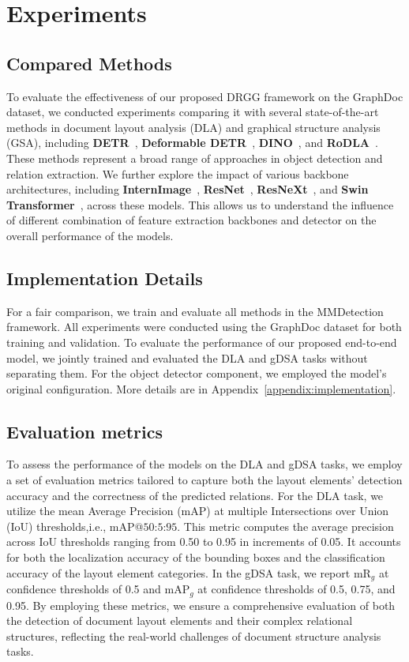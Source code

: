 \section{Experiments}

\subsection{Compared Methods}
To evaluate the effectiveness of our proposed DRGG framework on the GraphDoc dataset, we conducted experiments comparing it with several state-of-the-art methods in document layout analysis (DLA) and graphical structure analysis (GSA), including \textbf{DETR}~\citep{DETR}, \textbf{Deformable DETR}~\citep{zhu2020deformable}, \textbf{DINO}~\citep{zhang2022dino}, and \textbf{RoDLA}~\citep{chen2024rodla}. These methods represent a broad range of approaches in object detection and relation extraction. We further explore the impact of various backbone architectures, including \textbf{InternImage}~\citep{wang2022internimage}, \textbf{ResNet}~\citep{he2016deepresnet}, \textbf{ResNeXt}~\citep{ResNext}, and \textbf{Swin Transformer}~\citep{liu2021swintransformerhierarchicalvision}, across these models. This allows us to understand the influence of different combination of feature extraction backbones and detector on the overall performance of the models.

\subsection{Implementation Details}
\label{implementation}
For a fair comparison, we train and evaluate all methods in the MMDetection~\citep{mmdetection} framework. All experiments were conducted using the GraphDoc dataset for both training and validation. To evaluate the performance of our proposed end-to-end model, we jointly trained and evaluated the DLA and gDSA tasks without separating them. For the object detector component, we employed the model's original configuration. More details are in Appendix~\ref{appendix:implementation}.

\subsection{Evaluation metrics}
\label{eval_all}
To assess the performance of the models on the DLA and gDSA tasks, we employ a set of evaluation metrics tailored to capture both the layout elements' detection accuracy and the correctness of the predicted relations. For the DLA task, we utilize the mean Average Precision (mAP) at multiple Intersections over Union (IoU) thresholds,i.e., mAP@$50$:$5$:$95$. This metric computes the average precision across IoU thresholds ranging from 0.50 to 0.95 in increments of 0.05. It accounts for both the localization accuracy of the bounding boxes and the classification accuracy of the layout element categories. In the gDSA task, we report mR$_g$ at confidence thresholds of 0.5 and mAP$_g$ at confidence thresholds of 0.5, 0.75, and 0.95. By employing these metrics, we ensure a comprehensive evaluation of both the detection of document layout elements and their complex relational structures, reflecting the real-world challenges of document structure analysis tasks.

